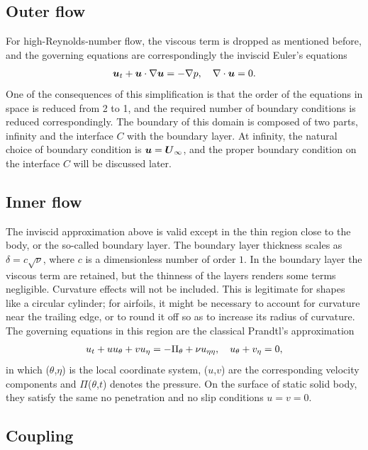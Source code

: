 \subsection{Outer flow}

For high-Reynolds-number flow, the viscous term is dropped as mentioned before, and the governing equations are correspondingly the inviscid Euler's equations
\begin{align}
\boldsymbol{u}_t + \boldsymbol{u} \cdot \nabla \boldsymbol{u}  =  -\nabla p,  \quad
\nabla \cdot \boldsymbol{u}  =  0.
\label{eqn:Euler}
\end{align}
One of the consequences of this simplification is that the order of the equations in space is reduced from 2 to 1, and the required number of boundary conditions is reduced correspondingly.
The boundary of this domain is composed of two parts, infinity and the interface $C$ with the boundary layer. 
At infinity, the natural choice of boundary condition is $\boldsymbol{u} = \boldsymbol{U}_{\infty}$, and the proper boundary condition on the interface $C$ will be discussed later.

\subsection{Inner flow}

The inviscid approximation above is valid except in the thin region close to the body, or the so-called boundary layer.
The boundary layer thickness scales as $\delta = c\sqrt{\nu}$, where $c$ is a dimensionless number of order $1$.
In the boundary layer the viscous term are retained, but the thinness of the layers renders some terms negligible.
Curvature effects will not be included.
This is legitimate for shapes like a circular cylinder; for airfoils, it might be necessary to account for curvature near the trailing edge, or to round it off so as to increase its radius of curvature.
The governing equations in this region are the classical Prandtl's approximation
\begin{align}
u_t + uu_{\theta} + vu_{\eta}  =  - \Pi_{\theta} + \nu u_{\eta\eta},  \quad
u_\theta + v_\eta  =  0,
\label{eqn:Prandtl}
\end{align}
in which ($\theta$,$\eta$) is the local coordinate system, ($u$,$v$) are the corresponding velocity components and $\Pi$($\theta$,$t$) denotes the pressure. 
On the surface of static solid body, they satisfy the same no penetration and no slip conditions $u = v = 0$.

\subsection{Coupling}

